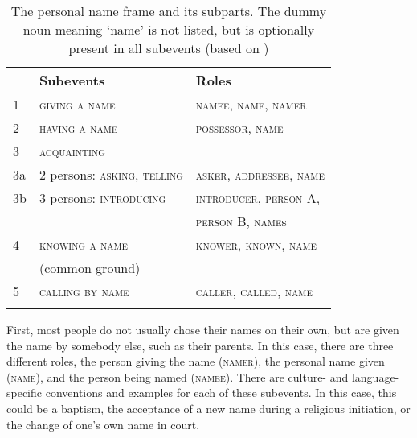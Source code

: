 \documentclass[output=paper,colorlinks,citecolor=brown]{langscibook}
\begin{document}
\begin{table}
\begin{tabular}{ l l l }
  \lsptoprule
        &	Subevents                   &	Roles\\
  \midrule
1   &	\textsc{giving a name}                   &	\textsc{namee}, \textsc{name}, \textsc{namer}\\
2   &	\textsc{having a name}                   &	\textsc{possessor}, \textsc{name}\\
3   &	\textsc{acquainting}	\\
3a  &	2 persons: \textsc{asking, telling}      &	\textsc{asker}, \textsc{addressee}, \textsc{name}\\
3b  &	3 persons: \textsc{introducing}          &	\textsc{introducer}, \textsc{person} A,\\
    &                                   &   \textsc{person} B, \textsc{name}s\\
4   &	\textsc{knowing a name}                  &	\textsc{knower}, \textsc{known}, \textsc{name}\\
    &   (common ground)                 &\\
5   &	\textsc{calling by name}                 &	\textsc{caller}, \textsc{called}, \textsc{name}\\
  \lspbottomrule
\end{tabular}
\caption{The personal name frame and its subparts. The dummy noun meaning ‘name’ is not listed, but is optionally present in all subevents (based on \citealt{Hölzl2014})}
\label{table:4.4}
\end{table}

First, most people do not usually chose their names on their own, but are given the name by somebody else, such as their parents. In this case, there are three different roles, the person giving the name (\textsc{namer}), the personal name given (\textsc{name}), and the person being named (\textsc{namee}). There are culture- and language-specific conventions and examples for each of these subevents. In this case, this could be a baptism, the acceptance of a new name during a religious initiation, or the change of one’s own name in court.
\end{document}
